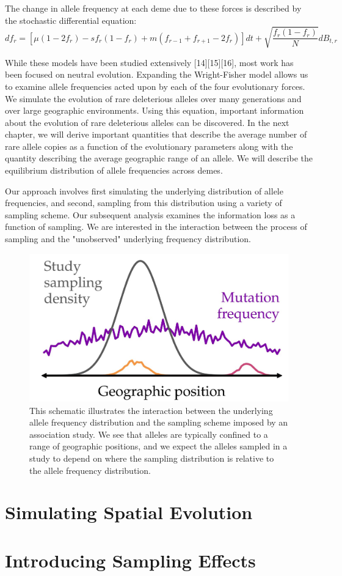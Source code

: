 \newpage
The change in allele frequency at each deme due to these forces is described by the stochastic differential equation:
\begin{equation}
    \label{eq:model}
    df_r=[\mu(1-2f_r)-sf_r (1-f_r ) + m (f_{r-1}+f_{r+1}-2f_r)]dt+\sqrt{\frac{f_r (1-f_r )}{N}} dB_{t,r}
\end{equation}


While these models have been studied extensively [14][15][16], most work has been focused on neutral evolution. Expanding the Wright-Fisher model allows us to examine allele frequencies acted upon by each of the four evolutionary forces. We simulate the evolution of rare deleterious alleles over many generations and over large geographic environments. Using this equation, important information about the evolution of rare deleterious alleles can be discovered. In the next chapter, we will derive important quantities that describe the average number of rare allele copies as a function of the evolutionary parameters along with the quantity describing the average geographic range of an allele. We will describe the equilibrium distribution of allele frequencies across demes.


Our approach involves first simulating the underlying distribution of allele frequencies, and second, sampling from this distribution using a variety of sampling scheme. Our subsequent analysis examines the information loss as a function of sampling. We are interested in the interaction between the process of sampling and the "unobserved" underlying frequency distribution. 

\begin{figure}[h]
    \centering
    \includegraphics[scale=0.5]{img/smapling_schematic.JPG}
    \caption{This schematic illustrates the interaction between the underlying allele frequency distribution and the sampling scheme imposed by an association study. We see that alleles are typically confined to a range of geographic positions, and we expect the alleles sampled in a study to depend on where the sampling distribution is relative to the allele frequency distribution.}
    \label{fig:sampling_schematic}
\end{figure}

\newpage
\section{Simulating Spatial Evolution}




\section{Introducing Sampling Effects}

